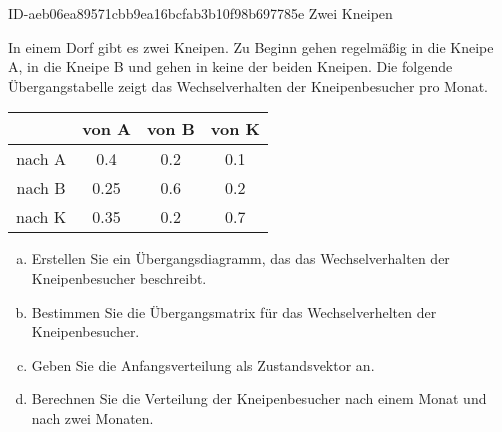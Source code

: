 \begin{exercise}
      {ID-aeb06ea89571cbb9ea16bcfab3b10f98b697785e}
      {Zwei Kneipen}
  \ifproblem\problem\par
    In einem Dorf gibt es zwei Kneipen.
    Zu Beginn gehen  regelmäßig in die
    Kneipe A,  in die Kneipe B und
     gehen in keine der beiden Kneipen.
    Die folgende Übergangstabelle zeigt das
    Wechselverhalten der Kneipenbesucher pro
    Monat.
    \begin{center}
      \begingroup
        \setlength{\tabcolsep}{0.75em}%
        \renewcommand{\arraystretch}{1.2}%
        \begin{tabular}{|c|c|c|c|}
          \hline
                 & von A      & von B     & von K     \\
          \hline
          nach A & \num{0.4}  & \num{0.2} & \num{0.1} \\
          \hline
          nach B & \num{0.25} & \num{0.6} & \num{0.2} \\
          \hline
          nach K & \num{0.35} & \num{0.2} & \num{0.7} \\
          \hline
        \end{tabular}
      \endgroup
    \end{center}
    \begin{enumerate}[a)]
      \item Erstellen Sie ein Übergangsdiagramm, das das
            Wechselverhalten der Kneipenbesucher beschreibt.
      \item Bestimmen Sie die Übergangsmatrix für das
            Wechselverhelten der Kneipenbesucher.
      \item Geben Sie die Anfangsverteilung als Zustandsvektor an.
      \item Berechnen Sie die Verteilung der Kneipenbesucher
            nach einem Monat und nach zwei Monaten.
    \end{enumerate}
  \fi
\end{exercise}
